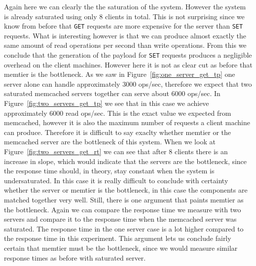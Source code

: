\documentclass[11pt,a4paper]{article}
\begin{document}
%
Again here we can clearly the the saturation of the system.
%
However the system is already saturated using only 8 clients in total.
%
This is not surprising since we know from before that \texttt{GET} requests are more expensive for the server than \texttt{SET} requests.
%
What is interesting however is that we can produce almost exactly the same amount of read operations per second than write operations. 
%
From this we conclude that the generation of the payload for \texttt{SET} requests produces a negligible overhead on the client machines.
%
However here it is not as clear cut as before that memtier is the bottleneck.
%
As we saw in Figure~\ref{fig:one_server_get_tp} one server alone can handle approximately 3000 ops/sec, therefore we expect that two saturated memcached servers together can serve about 6000 ops/sec.
%
In Figure~\ref{fig:two_servers_get_tp} we see that in this case we achieve approximately 6000 read ops/sec.
%
This is the exact value we expected from memcached, however it is also the maximum number of requests a client machine can produce.
%
Therefore it is difficult to say exaclty whether memtier or the memcached server are the bottleneck of this system.
%
When we look at Figure~\ref{fig:two_servers_get_rt} we can see that after 8 clients there is an increase in slope, which would indicate that the servers are the bottleneck, since the response time should, in theory, stay constant when the system is undersaturated.
%
In this case it is really difficult to conclude with certainty whether the server or memtier is the bottleneck, in this case the components are matched together very well.
%
Still, there is one argument that paints memtier as the bottleneck.
%
Again we can compare the response time we measure with two servers and compare it to the response time when the memcached server was saturated.
%
The response time in the one server case is a lot higher compared to the response time in this experiment. 
%
This argument lets us conclude fairly certain that memtier must be the bottleneck, since we would measure similar response times as before with saturated server.
%
\end{document}
